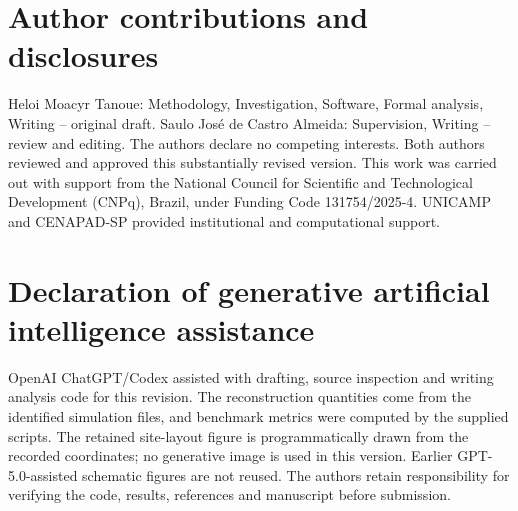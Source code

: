 \documentclass[preprint,12pt,authoryear]{elsarticle}
\begin{document}
\section*{Author contributions and disclosures}
Heloi Moacyr Tanoue: Methodology, Investigation, Software, Formal analysis,
Writing -- original draft. Saulo Jos\'e de Castro Almeida: Supervision,
Writing -- review and editing. The authors declare no competing interests.
Both authors reviewed and approved this substantially revised version. This
work was carried out with support from the National Council for Scientific
and Technological Development (CNPq), Brazil, under Funding Code
131754/2025-4. UNICAMP and CENAPAD-SP provided institutional and
computational support.

\section*{Declaration of generative artificial intelligence assistance}
OpenAI ChatGPT/Codex assisted with drafting, source inspection and writing
analysis code for this revision. The reconstruction quantities come from
the identified simulation files, and benchmark metrics were computed by
the supplied scripts. The retained site-layout figure is programmatically
drawn from the recorded coordinates; no generative image is used in this
version. Earlier GPT-5.0-assisted schematic figures are not reused. The
authors retain responsibility for verifying the code, results, references
and manuscript before submission.



\end{document}
